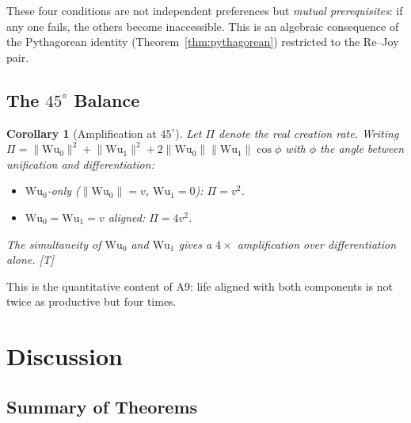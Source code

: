 \documentclass[11pt, a4paper]{article}
\newtheorem{corollary}{Corollary}
\newcommand{\Wuz}{\mathrm{Wu}_0}
\newcommand{\Wuo}{\mathrm{Wu}_1}
\newcommand{\norm}[1]{\lVert #1 \rVert}
\begin{document}
These four conditions are not independent preferences but
\emph{mutual prerequisites}: if any one fails, the others become
inaccessible. This is an algebraic consequence of the Pythagorean
identity (Theorem~\ref{thm:pythagorean}) restricted to the Re--Joy
pair.

\subsection{The $45^\circ$ Balance}

\begin{corollary}[Amplification at $45^\circ$]
\label{cor:amplification}
Let $\Pi$ denote the real creation rate. Writing
$\Pi = \norm{\Wuz}^2 + \norm{\Wuo}^2 + 2\norm{\Wuz}\norm{\Wuo}\cos\phi$
with $\phi$ the angle between unification and differentiation:
\begin{itemize}[nosep]
\item $\Wuz$-only ($\norm{\Wuz} = v$, $\Wuo = 0$): $\Pi = v^2$.
\item $\Wuz = \Wuo = v$ aligned: $\Pi = 4v^2$.
\end{itemize}
The simultaneity of $\Wuz$ and $\Wuo$ gives a $4\times$ amplification
over differentiation alone. [T]
\end{corollary}

This is the quantitative content of A9: life aligned with both
components is not twice as productive but four times.

\section{Discussion}
\label{sec:discussion}

\subsection{Summary of Theorems}
\end{document}
